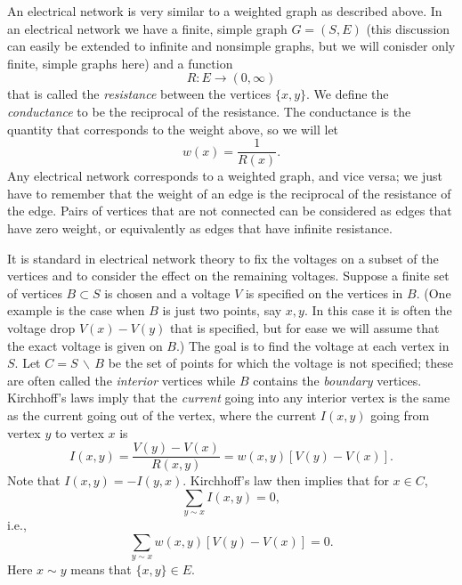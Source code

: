 \documentclass{stml-l}
\theoremstyle{definition}
\numberwithin{equation}{chapter}
\numberwithin{figure}{chapter}
\numberwithin{figure}{section}
\begin{document}
An electrical network is very similar to a weighted graph as
described above. In an electrical network we have a finite, simple
graph $G=(S,E)$ (this discussion can easily be extended to infinite
and nonsimple graphs, but we will conisder only finite, simple
graphs here) and a function
\begin{equation*}
R:E\rightarrow(0,\infty)
\end{equation*}
that is called the \emph{resistance} between the vertices $\{x,y\}$.
We define the \emph{conductance} to be the reciprocal of the
resistance. The conductance is the quantity that corresponds to the
weight above, so we will let
\begin{equation*}
w(x)=\frac{1}{R(x)}.
\end{equation*}
Any electrical network corresponds to a weighted graph, and vice
versa; we just have to remember that the weight of an edge is the
reciprocal of the resistance of the edge. Pairs of vertices that are
not connected can be considered as edges that have zero weight, or
equivalently as edges that have infinite resistance.

It is standard in electrical network theory to fix the voltages on a
subset of the vertices and to consider the effect on the remaining
voltages. Suppose a finite set of vertices $B\subset S$ is chosen
and a voltage $V$ is specified on the vertices in $B$. (One example
is the case when $B$ is just two points, say $x,y$. In this case it
is often the voltage drop $V(x)-V(y)$ that is specified, but for
ease we will assume that the exact voltage is given on $B$.) The
goal is to find the voltage at each vertex in $S$. Let
$C=S\,\backslash\,B$ be the set of points for which the voltage is
not specified; these are often called the \emph{interior} vertices
while $B$ contains the \emph{boundary} vertices. Kirchhoff's laws
imply that the \emph{current} going into any interior vertex is the
same as the current going out of the vertex, where the current
$I(x,y)$ going from vertex $y$ to vertex $x$ is
\begin{equation*}
I(x,y)=\frac{V(y)-V(x)}{R(x,y)}=w(x,y)[V(y)-V(x)].
\end{equation*}
Note that $I(x,y)=-I(y,x)$. Kirchhoff's law then implies that for
$x\in C$,
\begin{equation*}
\sum\limits_{y\sim x}I(x,y)=0,
\end{equation*}
i.e.,
\begin{equation}
\label{ch09:eqn9.1}\sum\limits_{y\sim x}w(x,y)[V(y)-V(x)]=0.
\end{equation}
Here $x\sim y$ means that $\{x,y\}\in E$.
\end{document}

